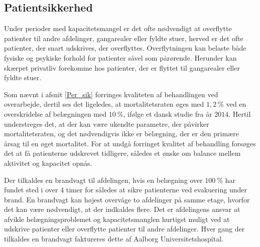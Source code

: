\subsection{Patientsikkerhed}
Under perioder med kapacitetsmangel er det ofte nødvendigt at overflytte patienter til andre afdelinger, gangarealer eller fyldte stuer, herved er det ofte patienter, der snart udskrives, der overflyttes.  Overflytningen kan belaste både fysiske og psykiske forhold for patienter såvel som pårørende\cite{Heidmann2014}. Herunder kan skærpet privatliv forekomme hos patienter, der er flyttet til gangarealer eller fyldte stuer\cite{Madsen2014}. 

Som nævnt i afsnit \ref{Per_sik} forringes kvaliteten af behandlingen ved overarbejde, dertil ses det ligeledes, at mortalitetsraten øges med $1,2~\%$ ved en overskridelse af belægningen med $10~\%$, ifølge et dansk studie fra år $2014$\cite{Madsen2014}. Hertil understreges det, at der kan være ukendte parametre, der påvirker mortalitetsraten, og det nødvendigvis ikke er belægning, der er den primære årsag til en øget mortalitet. For at undgå forringet kvalitet af behandling forsøges det at få patienterne udskrevet tidligere, således et ønske om balance mellem aktivitet og kapacitet opnås.


Der tilkaldes en brandvagt til afdelingen, hvis en belægning over $100~\%$ har fundet sted i over $4$ timer for således at sikre patienterne ved evakuering under brand. En brandvagt kan højest overvåge to afdelinger på samme etage, hvorfor det kan være nødvendigt, at der indkaldes flere. Det er afdelingens ansvar at afvikle belægningsproblemet og kapacitetsmanglen hurtigst muligt ved at udskrive patienter eller overflytte patienter til andre afdelinger.  Hver gang der tilkaldes en brandvagt faktureres dette af Aalborg Universitetshospital.\cite{Beredskab2016}


